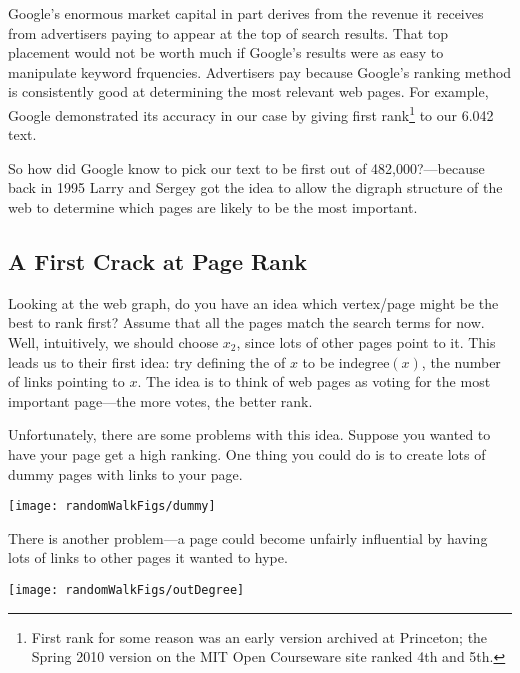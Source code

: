 \iffalse
One way to get placed high on the list is to pay Google an advertising
fee---and Google gets an enormous revenue stream from these fees.
Of course an early listing is worth a fee only if an advertiser's
target audience is attracted to the listing.  But an audience does get
attracted to Google listings because its ranking method is really good
at determining the most relevant web pages.\fi

Google's enormous market capital in part derives from the revenue it
receives from advertisers paying to appear at the top of search
results.  That top placement would not be worth much if Google's
results were as easy to manipulate keyword frquencies.  Advertisers
pay because Google's ranking method is consistently good at
determining the most relevant web pages.  For example, Google
demonstrated its accuracy in our case by giving first
rank\footnote{First rank for some reason was an early version archived
  at Princeton; the Spring 2010 version on the MIT Open Courseware
  site ranked 4th and 5th.} to our 6.042 text.

So how did Google know to pick our text to be first out of
482,000?---because back in 1995 Larry and Sergey got the idea to allow
the digraph structure of the web to determine which pages are likely
to be the most important.

\subsection{A First Crack at Page Rank}

Looking at the web graph, do you have an idea which vertex/page might
be the best to rank first?  Assume that all the pages match the search
terms for now.  Well, intuitively, we should choose $x_2$, since lots
of other pages point to it.  This leads us to their first idea: try
defining the  of $x$ to be $\text{indegree}(x)$, the
number of links pointing to $x$.  The idea is to think of web pages as
voting for the most important page---the more votes, the better rank.

Unfortunately, there are some problems with this idea.  Suppose you
wanted to have your page get a high ranking.  One thing you could do
is to create lots of dummy pages with links to your page.
\begin{center}
\texttt{[image: randomWalkFigs/dummy]}
\end{center}

There is another problem---a page could become unfairly influential by
having lots of links to other pages it wanted to hype.
\begin{center}
\texttt{[image: randomWalkFigs/outDegree]}
\end{center}

